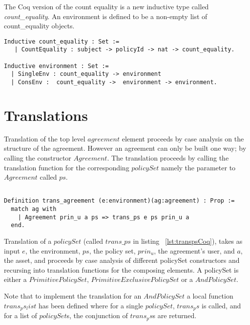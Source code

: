 The Coq version of the count equality is a new inductive type called \emph{count_equality}. An environment is defined to be a non-empty list of count_equality objects.

\begin{minipage}[c]{0.95\textwidth}
\begin{lstlisting}
Inductive count_equality : Set := 
   | CountEquality : subject -> policyId -> nat -> count_equality.

Inductive environment : Set := 
  | SingleEnv : count_equality -> environment
  | ConsEnv :  count_equality ->  environment -> environment.

\end{lstlisting}
\end{minipage}



\section{Translations}

Translation of the top level $agreement$ element proceeds by case analysis on the structure of the agreement. However an agreement can only be built one way; by calling the constructor $Agreement$. The translation proceeds by calling the translation function for the corresponding $policySet$ namely the parameter to $Agreement$ called $ps$.


\begin{lstlisting}

Definition trans_agreement (e:environment)(ag:agreement) : Prop :=
  match ag with 
    | Agreement prin_u a ps => trans_ps e ps prin_u a
  end.

\end{lstlisting}

Translation of a $policySet$ (called $trans\_ps$ in listing ~\ref{lst:transpsCoq}), takes as input $e$, the environment, $ps$, the policy set, $prin_{u}$, the agreement's user, and $a$, the asset, and proceeds by case analysis of different policySet constructors and recursing into translation functions for the composing elements. A policySet is either a $PrimitivePolicySet$, $PrimitiveExclusivePolicySet$ or a $AndPolicySet$. 

Note that to implement the translation for an $AndPolicySet$ a local function $trans_ps_list$ has been defined where for a single $policySet$, $trans_ps$ is called, and for a list of $policySet$s, the conjunction of $trans_ps$s are returned.

